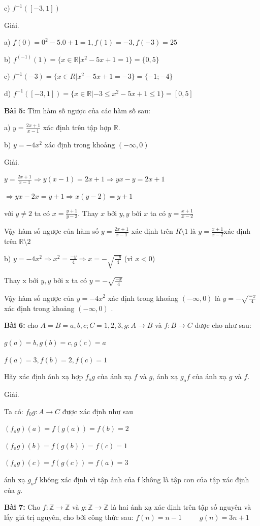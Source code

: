 \documentclass[12pt,oneside,a4paper,reqno]{book}
\begin{document}
c) $f^{-1} ([-3,1])$

Giải.

a) $f(0)=0^2-5.0+1=1,f(1)=-3,f(-3)=25$

b) $f^(-1) (1)=\{x\in \mathbb{R}| x^2-5x+1=1\}=\{0,5\}$

c) $f^{-1} (-3)=\{x\in R|x^2-5x+1=-3\}=\{-1;-4\}$

d) $f^{-1} ([-3,1])=\{x \in \mathbb{R} |-3\le x^2-5x+1\le 1\}=[0,5]$

\textbf{Bài 5: }Tìm hàm số ngược của các hàm số sau:

a) $y=\frac{2x+1}{x-1}$  xác định trên tập hợp $\mathbb{R}$.

b) $y=-4x^2$  xác định trong khoảng $(-\infty,0)$

Giải.

$y=\frac{2x+1}{x-1} \Rightarrow y(x-1)=2x+1\Rightarrow yx-y=2x+1$

$\Rightarrow yx-2x=y+1\Rightarrow x(y-2)=y+1$

với $y\neq 2$ ta có $x=\frac{y+1}{y-2}$. Thay $x$ bởi $y,y$ bởi $x$ ta có $y=\frac{x+1}{x-2}$

Vậy hàm số ngược của hàm số $y=\frac{2x+1}{x-1}$ xác định trên $R\setminus {1}$ là $y=\frac{x+1}{x-2}$xác định trên $\mathbb{R}\setminus{2}$

b) $y=-4x^2\Rightarrow x^2=\frac{-y}{4} \Rightarrow x=-\sqrt{\frac{-y}{4}}$  (vì $x<0$)

Thay x bởi $y, y$ bởi x ta có $y=-\sqrt{\frac{-x}{4}}$

Vậy hàm số ngược của $y=-4x^2$  xác định trong khoảng $(-\infty,0)$ là $y=- \sqrt{\frac{-x}{4}}$ xác định trong khoảng $(-\infty,0)$ .

\textbf{Bài 6: } cho $A=B={a,b,c};C={1,2,3},g:A\to B$ và $f:B\to C$  được cho như sau:

$g(a)=b,g(b)=c,g(c)=a$

$f(a)=3,f(b)=2,f(c)=1$

Hãy xác định ánh xạ hợp $f_o g$ của ánh xạ $f$ và $g$, ánh xạ $g_o f$ của ánh xạ $g$ và $f$.

Giải.

Ta có: 
$f_0 g:A\to C$ được xác định như sau

$(f_o g)(a)=f(g(a))=f(b)=2$  

$(f_o g)(b)=f(g(b))=f(c)=1$

$(f_o g)(c)=f(g(c))=f(a)=3$

ánh xạ $g_o f$ không xác định  vì tập ảnh của f không là tập con của tập xác định của $g$.

\textbf{Bài 7:} Cho $f: \mathbb{Z}\to  \mathbb{Z}$ và $g: \mathbb{Z}\to \mathbb{Z}$ là hai ánh xạ xác định trên tập số nguyên và lấy giá trị nguyên, cho bởi công thức sau:
$f(n)=n-1\;\;\;\;\;\;\;\;\; g(n)=3n+1$
\end{document}
